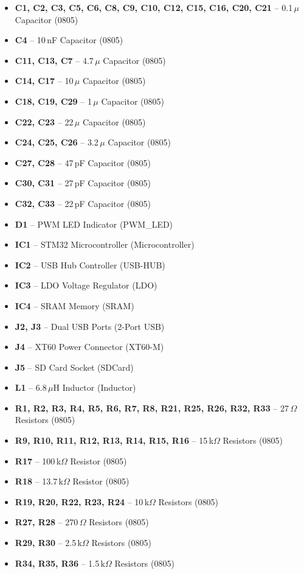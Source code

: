\documentclass[12pt]{article}
\begin{document}
\begin{itemize}
    \item \textbf{C1, C2, C3, C5, C6, C8, C9, C10, C12, C15, C16, C20, C21} – 0.1\,$\mu$ Capacitor (0805)
    \item \textbf{C4} – 10\,nF Capacitor (0805)
    \item \textbf{C11, C13, C7} – 4.7\,$\mu$ Capacitor (0805)
    \item \textbf{C14, C17} – 10\,$\mu$ Capacitor (0805)
    \item \textbf{C18, C19, C29} – 1\,$\mu$ Capacitor (0805)
    \item \textbf{C22, C23} – 22\,$\mu$ Capacitor (0805)
    \item \textbf{C24, C25, C26} – 3.2\,$\mu$ Capacitor (0805)
    \item \textbf{C27, C28} – 47\,pF Capacitor (0805)
    \item \textbf{C30, C31} – 27\,pF Capacitor (0805)
    \item \textbf{C32, C33} – 22\,pF Capacitor (0805)

    \item \textbf{D1} – PWM LED Indicator (PWM\_LED)
    
    \item \textbf{IC1} – STM32 Microcontroller (Microcontroller)
    \item \textbf{IC2} – USB Hub Controller (USB-HUB)
    \item \textbf{IC3} – LDO Voltage Regulator (LDO)
    \item \textbf{IC4} – SRAM Memory (SRAM)
    
    \item \textbf{J2, J3} – Dual USB Ports (2-Port USB)
    \item \textbf{J4} – XT60 Power Connector (XT60-M)
    \item \textbf{J5} – SD Card Socket (SDCard)
    
    \item \textbf{L1} – 6.8\,$\mu$H Inductor (Inductor)
    
    \item \textbf{R1, R2, R3, R4, R5, R6, R7, R8, R21, R25, R26, R32, R33} – 27\,$\Omega$ Resistors (0805)
    \item \textbf{R9, R10, R11, R12, R13, R14, R15, R16} – 15\,k$\Omega$ Resistors (0805)
    \item \textbf{R17} – 100\,k$\Omega$ Resistor (0805)
    \item \textbf{R18} – 13.7\,k$\Omega$ Resistor (0805)
    \item \textbf{R19, R20, R22, R23, R24} – 10\,k$\Omega$ Resistors (0805)
    \item \textbf{R27, R28} – 270\,$\Omega$ Resistors (0805)
    \item \textbf{R29, R30} – 2.5\,k$\Omega$ Resistors (0805)
    \item \textbf{R34, R35, R36} – 1.5\,k$\Omega$ Resistors (0805)


\end{itemize}
\end{document}
